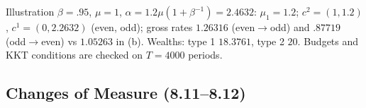 \documentclass[12pt, letterpaper]{article}
\begin{document}
\begin{tcolorbox}[evenbox,title={Exercise 8.10 \quad Corners}]
\begin{tcolorbox}[databox]
Illustration $\beta=.95$, $\mu=1$, $\alpha=1.2\mu(1+\beta^{-1})=2.4632$: $\mu_1=1.2$; $c^2=(1,1.2)$, $c^1=(0,2.2632)$
(even, odd); gross rates $1.26316$ (even$\to$odd) and $.87719$ (odd$\to$even) vs $1.05263$ in (b). Wealths:
type 1 $18.3761$, type 2 $20$. Budgets and KKT conditions are checked on $T=4000$ periods.
\end{tcolorbox}
\end{tcolorbox}

\subsection{Changes of Measure (8.11--8.12)}
\end{document}
